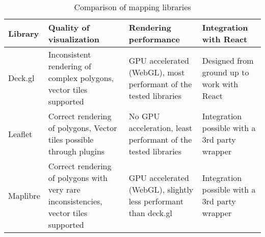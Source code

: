 \begin{table}[H]
	\caption{Comparison of mapping libraries}
	\label{tab:map library comparison}
	\centering
	\begin{tabular}{ | L{0.1\textwidth} | L{0.25\textwidth} | L{0.25\textwidth} | L{0.25\textwidth} | }
		\hline
		Library
		& Quality of visualization
		& Rendering performance
		& Integration with React
		\\ 
		\hline
		\hline
		Deck.gl
		& Inconsistent rendering of complex polygons, vector tiles supported
		& GPU accelerated (WebGL), most performant of the tested libraries
		& Designed from ground up to work with React
		\\
		\hline
		Leaflet
		& Correct rendering of polygons, Vector tiles possible through plugins
		& No GPU acceleration, least performant of the tested libraries
		& Integration possible with a 3rd party wrapper
		\\
		\hline
		Maplibre
		& Correct rendering of polygons with very rare inconsistencies, vector tiles supported
		& GPU accelerated (WebGL), slightly less performant than deck.gl
		& Integration possible with a 3rd party wrapper
		\\
		\hline
	\end{tabular}
\end{table}
